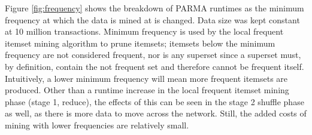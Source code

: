 Figure \ref{fig:frequency} shows the breakdown of PARMA runtimes as
the minimum frequency at which the data is mined at is changed. Data
size was kept constant at 10 million transactions. Minimum frequency
is used by the local frequent itemset mining algorithm to prune
itemsets; itemsets below the minimum frequency are not considered
frequent, nor is any superset since a superset must, by definition,
contain the not frequent set and therefore cannot be frequent
itself. Intuitively, a lower minimum frequency will mean more frequent
itemsets are produced. Other than a runtime increase in the local
frequent itemset mining phase (stage 1, reduce), the effects of this
can be seen in the stage 2 shuffle phase as well, as there is more
data to move across the network. Still, the added costs of mining with
lower frequencies are relatively small.


